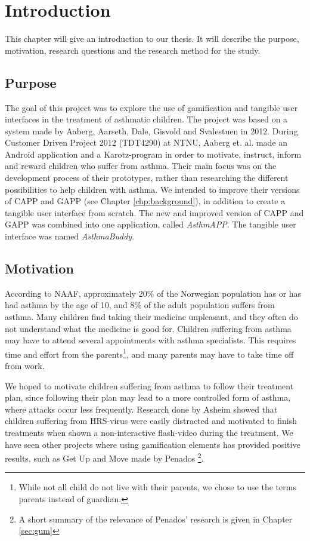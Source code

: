 \chapter{Introduction}
\label{chp:introduction}

This chapter will give an introduction to our thesis. It will describe the purpose, motivation, research questions and the research method for the study. 

\section{Purpose}
\label{sec:purpose}
The goal of this project was to explore the use of gamification and tangible user interfaces in the treatment of asthmatic children. The project was based on a system made by Aaberg, Aarseth, Dale, Gisvold and Svalestuen in 2012\cite{CustomerDriven}. During Customer Driven Project 2012 (TDT4290) at NTNU, Aaberg et. al. made an Android application and a Karotz-program in order to motivate, instruct, inform and reward children who suffer from asthma. Their main focus was on the development process of their prototypes, rather than researching the different possibilities to help children with asthma.
We intended to improve their versions of CAPP and GAPP (see Chapter \ref{chp:background}), in addition to create a tangible user interface from scratch. The new and improved version of CAPP and GAPP was combined into one application, called \emph{AsthmAPP}. The tangible user interface was named \emph{AsthmaBuddy}.  
 

\section{Motivation}
\label{sec:motivation}

According to NAAF, approximately 20\% of the Norwegian population has or has had asthma by the age of 10, and 8\% of the adult population suffers from asthma\cite{NAAFStat}. Many children find taking their medicine unpleasant, and they often do not understand what the medicine is good for. Children suffering from asthma may have to attend several appointments with asthma specialists. This requires time and effort from the parents\footnote{While not all child do not live with their parents, we chose to use the terms parents instead of guardian.}, and many parents may have to take time off from work. 

We hoped to motivate children suffering from asthma to follow their treatment plan, since following their plan may lead to a more controlled form of asthma, where attacks occur less frequently\cite{ginasthma}. 
Research done by Asheim showed that children suffering from HRS-virus were easily distracted and motivated to finish treatments when shown a non-interactive flash-video during the treatment\cite{asheim2012konsept}. We have seen other projects where using gamification elements has provided positive results, such as Get Up and Move made by Penados \etal{}\cite{penadosget}\footnote{A short summary of the relevance of Penados' research is given in Chapter \ref{sec:gum}}. 

